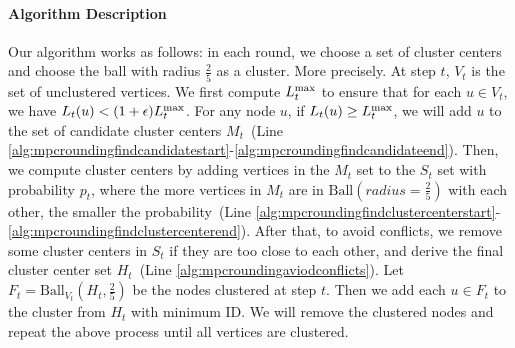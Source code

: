 \documentclass[11pt]{article}
\newcommand{\ball}{\mathrm{Ball}}
\newcommand{\twofive}{\frac{2}{5}}
\begin{document}
\begin{CJK*}{UTF8}{gbsn}
\paragraph{Algorithm Description}Our algorithm works as follows: in each round, we choose a set of cluster centers and choose the ball with radius $\twofive$ as a cluster. More precisely. At step $t$, $V_t$ is the set of unclustered vertices. We first compute $L_t^{\textmd{max}}$ to ensure that for each $u\in V_t$, we have $L_t(u) < (1+\epsilon) L_t^{\textmd{max}}$. For any node $u$, if $L_t(u) \geq L_t^{\textmd{max}}$, we will add $u$ to the set of candidate cluster centers $M_t$~(Line \ref{alg:mpcroundingfindcandidatestart}-\ref{alg:mpcroundingfindcandidateend}). Then, we compute cluster centers by adding vertices in the $M_t$ set to the $S_t$ set with probability $p_t$, where the more vertices in $M_t$ are in $\ball(radius=\twofive)$ with each other, the smaller the probability~(Line \ref{alg:mpcroundingfindclustercenterstart}-\ref{alg:mpcroundingfindclustercenterend}). After that, to avoid conflicts, we remove some cluster centers in $S_t$ if they are too close to each other, and derive the final cluster center set $H_t$~(Line \ref{alg:mpcroundingaviodconflicts}). Let $F_t = \ball_{V_t}(H_t,\twofive)$ be the nodes clustered at step $t$. Then we add each $u \in F_t$ to the cluster from $H_t$ with minimum ID. We will remove the clustered nodes and repeat the above process until all vertices are clustered.



\end{CJK*}
\end{document}
